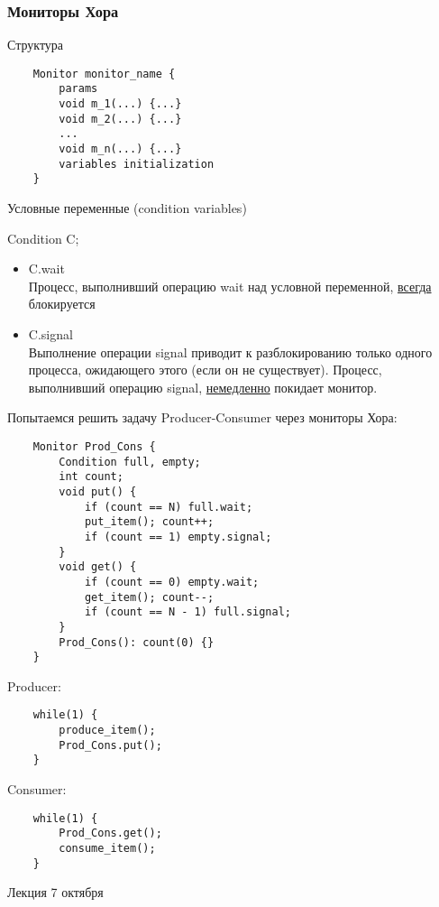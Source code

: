 \documentclass[12pt, a4paper]{article}
\begin{document}
    \subsubsection*{Мониторы Хора}
    \begin{center}
        Структура
    \end{center}
    \begin{lstlisting}
    Monitor monitor_name {
        params
        void m_1(...) {...}
        void m_2(...) {...}
        ...
        void m_n(...) {...}
        variables initialization
    }
    \end{lstlisting}
    \begin{center}
        Условные переменные (condition variables)
    \end{center}
    Condition C;
    \begin{itemize}
        \item C.wait\\
        Процесс, выполнивший операцию wait над условной переменной, \underline{всегда} блокируется
        \item C.signal\\
        Выполнение операции signal приводит к разблокированию только одного процесса, ожидающего этого (если он не существует). Процесс, выполнивший операцию signal, \underline{немедленно} покидает монитор.
    \end{itemize}
    Попытаемся решить задачу Producer-Consumer через мониторы Хора:
    \begin{lstlisting}
    Monitor Prod_Cons {
        Condition full, empty;
        int count;
        void put() {
            if (count == N) full.wait;
            put_item(); count++;
            if (count == 1) empty.signal;
        }
        void get() {
            if (count == 0) empty.wait;
            get_item(); count--;
            if (count == N - 1) full.signal;
        }
        Prod_Cons(): count(0) {}
    }
    \end{lstlisting}
    Producer:
    \begin{lstlisting}
    while(1) {
        produce_item();
        Prod_Cons.put();
    }
    \end{lstlisting}
    Consumer:
    \begin{lstlisting}
    while(1) {
        Prod_Cons.get();
        consume_item();
    }
    \end{lstlisting}
    \begin{center}
        Лекция 7 октября
    \end{center}
\end{document}
